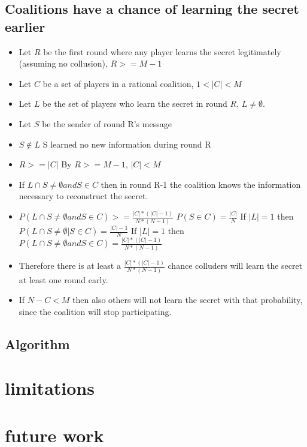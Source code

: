 \documentclass{article}
\begin{document}
\subsection{Coalitions have a chance of learning the secret earlier}
\begin{itemize}
  \item Let $R$ be the first round where any player learns the secret legitimately (assuming no collusion), $R >= M-1$
  \item Let $C$ be a set of players in a rational coalition, $1 < |C| < M$
  \item Let $L$ be the set of players who learn the secret in round $R$, $L \not = \emptyset$.
  \item Let $S$ be the sender of round R's message
  \item $S \not \in L$
    \subitem S learned no new information during round R
  \item $R >= |C|$
    \subitem By $R >= M-1$, $|C| < M$
  \item If $L \cap S \not = \emptyset and S \in C$ then in round R-1 the coalition knows the information necessary to reconstruct the secret.
  \item $P(L \cap S \not = \emptyset and S \in C) >= \frac{|C|*(|C|-1)}{N*(N-1)}$
  	\subitem $P(S \in C) = \frac{|C|}{N}$
    \subitem If $|L| = 1$ then $P(L \cap S \not = \emptyset | S \in C) = \frac{|C|-1}{N}$
    \subitem If $|L| = 1$ then $P(L \cap S \not = \emptyset and S \in C) = \frac{|C|*(|C|-1)}{N*(N-1)}$
  \item Therefore there is at least a $\frac{|C|*(|C|-1)}{N*(N-1)}$ chance colluders will learn the secret at least one round early.
  \item If $N - C < M$ then also others will not learn the secret with that probability, since the coalition will stop participating. 
\end{itemize}



\subsection{Algorithm}

\section{limitations}
\section{future work}
\end{document}
